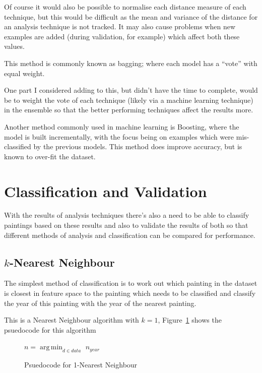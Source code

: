 Of course it would also be possible to normalise each distance measure of each technique, but this
would be difficult as the mean and variance of the distance for an analysis technique is not 
tracked. It may also cause problems when new examples are added (during validation, for example)
which affect both these values.

This method is commonly known as \gls{bagging}; where each model has a ``vote'' with equal weight.

One part I considered adding to this, but didn't have the time to complete, would be to weight the
vote of each technique (likely via a machine learning technique) in the ensemble so that the 
better performing techniques affect the results more.

Another method commonly used in machine learning is Boosting, where the model is built 
incrementally, with the focus being on examples which were mis-classified by the previous models.
This method does improve accuracy, but is known to over-fit the dataset. 


\section{Classification and Validation}
With the results of analysis techniques there's also a need to be able to classify paintings based
on these results and also to validate the results of both so that different methods of analysis
and classification can be compared for performance.

\subsection{$k$-Nearest Neighbour}
The simplest method of classification is to work out which painting in the dataset is closest in
feature space to the painting which needs to be classified and classify the year of this painting
with the year of the nearest painting.

This is a Nearest Neighbour algorithm with $k=1$, Figure~\ref{fig:1nn} shows the psuedocode
for this algorithm

\begin{figure}[h]
\begin{algorithmic}
\State $n = \operatorname*{arg\,min}_{d \in data}$ 
\State\Return $n_{year}$
\EndFunction
\end{algorithmic}
\caption{Psuedocode for 1-Nearest Neighbour}\label{fig:1nn}
\end{figure}

